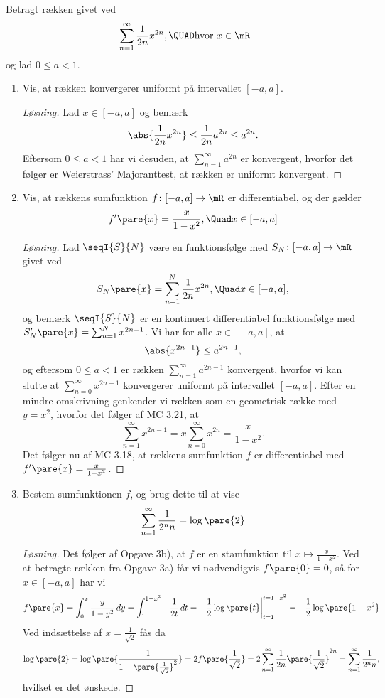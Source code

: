\begin{opg}
Betragt rækken givet ved
$$ \sum_{n=1}^\infty \frac{1}{2n}x^{2n}, \QUAD\text{hvor } x\in\mR $$
og lad $0\leq a < 1$. 
\begin{enumerate}
    \item Vis, at rækken konvergerer uniformt på intervallet $[-a,a]$.
    
    \begin{proof}[Løsning]
    Lad $x\in[-a,a]$ og bemærk
    $$ \abs{\frac{1}{2n}x^{2n}} \leq \frac{1}{2n}a^{2n} \leq a^{2n}. $$
    Eftersom $0\leq a < 1$ har vi desuden, at
    $\sum_{n=1}^\infty a^{2n}$ er konvergent, hvorfor det følger er Weierstrass' Majoranttest, at rækken er uniformt konvergent.
    \end{proof}

    \item Vis, at rækkens sumfunktion $f\colon [-a,a]\to\mR$ er differentiabel, og der gælder
    $$ f'\pare{x} = \frac{x}{1-x^2}, \Quad x\in[-a,a] $$
    
    \begin{proof}[Løsning]
    Lad $\seqI{S}{N}$ være en funktionsfølge med $S_N\colon [-a,a]\to\mR$ givet ved
    $$ S_N\pare{x} = \sum_{n=1}^N \frac{1}{2n}x^{2n}, \Quad x\in [-a,a], $$
    og bemærk $\seqI{S}{N}$ er en kontinuert differentiabel funktionsfølge med $S_N'\pare{x} = \sum_{n=1}^N x^{2n-1}$. Vi har for alle $x\in[-a,a]$, at 
    $$ \abs{x^{2n-1}} \leq a^{2n-1}, $$
    og eftersom $0\leq a < 1$ er rækken $\sum_{n=1}^\infty a^{2n-1}$ konvergent, hvorfor vi kan slutte at $\sum_{n=0}^\infty x^{2n-1}$ konvergerer uniformt på intervallet $[-a,a]$. Efter en mindre omskrivning genkender vi rækken som en geometrisk række med $y = x^2$, hvorfor det følger af MC 3.21, at
    $$ \sum_{n=1}^\infty x^{2n-1} = x\sum_{n=0}^\infty x^{2n}
        = \frac{x}{1-x^2}. $$
    Det følger nu af MC 3.18, at rækkens sumfunktion $f$ er differentiabel med $f'\pare{x} = \frac{x}{1-x^2}$.
    \end{proof}
    
    \item Bestem sumfunktionen $f$, og brug dette til at vise
    $$ \sum_{n=1}^\infty \frac{1}{2^nn} = \log\pare{2} $$
    
    \begin{proof}[Løsning]
    Det følger af Opgave 3b), at $f$ er en stamfunktion til $x\mapsto\frac{x}{1-x^2}$. Ved at betragte rækken fra Opgave 3a) får vi nødvendigvis $f\pare{0} = 0$, så for $x\in[-a,a]$ har vi
    $$ f\pare{x} = \int_0^x \frac{y}{1-y^2} \,dy
        = \int_1^{1-x^2} -\frac{1}{2t} \,dt
        = -\frac{1}{2}\log\pare{t}\bigg|_{t=1}^{t=1-x^2} = -\frac{1}{2}\log\pare{1-x^2} $$
    Ved indsættelse af $x = \frac{1}{\sqrt{2}}$ fås da
    $$ \log\pare{2} = \log\pare{\frac{1}{1-\pare{\frac{1}{\sqrt{2}}}^2}}
        = 2f\pare{\frac{1}{\sqrt{2}}}
        = 2\sum_{n=1}^\infty \frac{1}{2n}\pare{\frac{1}{\sqrt{2}}}^{2n}
        = \sum_{n=1}^\infty \frac{1}{2^nn}, $$
    hvilket er det ønskede.
    \end{proof}
\end{enumerate}
\end{opg}

